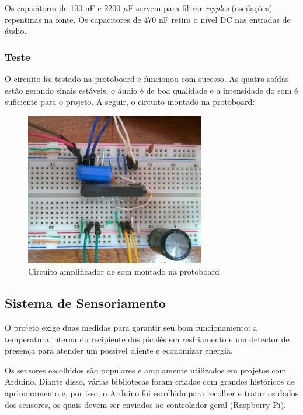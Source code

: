 Os capacitores de 100 nF e 2200 $\mu$F servem para filtrar \textit{ripples} (oscilações) repentinas na fonte. Os capacitores de 470 nF retira o nível DC nas entradas de áudio. 

\subsubsection{Teste}

O circuito foi testado na protoboard e funcionou com sucesso. As quatro saídas estão gerando sinais estáveis, o áudio é de boa qualidade e a intensidade do som é suficiente para o projeto. A seguir, o circuito montado na protoboard:

\begin{figure}[H]
	\centering
    \includegraphics[width=0.7\textwidth]{figuras/Sistema_som_prot}
    \caption{Circuito amplificador de som montado na protoboard}
    \label{fig:Sistema_som_prot}
\end{figure}

\subsection{Sistema de Sensoriamento}

O projeto exige duas medidas para garantir seu bom funcionamento: a temperatura interna do recipiente dos picolés em resfriamento e um detector de presença para atender um possível cliente e economizar energia.

Os sensores escolhidos são populares e amplamente utilizados em projetos com Arduino. Diante disso, várias bibliotecas foram criadas com grandes históricos de aprimoramento e, por isso, o Arduino foi escolhido para recolher e tratar os dados dos sensores, os quais devem ser enviados ao controlador geral (Raspberry Pi).

